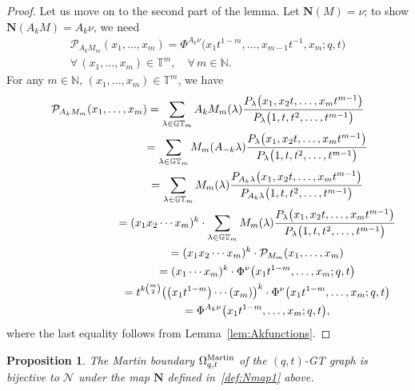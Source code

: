 \documentclass[pdftex]{sigma}
\numberwithin{equation}{section}
\newtheorem{prop}[thm]{Proposition}
\newcommand{\N}{\mathbb{N}}
\newcommand{\Nu}{\mathcal{N}}
\newcommand{\GT}{\mathbb{GT}}
\newcommand{\PPP}{\mathcal{P}}
\newcommand{\TT}{\mathbb{T}}
\newcommand{\NN}{\mathbf{N}}
\begin{document}
\begin{proof}
Let us move on to the second part of the lemma. Let $\NN(M) = \nu$; to show $\NN(A_k M) = A_k \nu$, we need
\begin{gather*}
\PPP_{A_k M_m}(x_1, \dots, x_m) = \Phi^{A_k\nu}\big(x_1 t^{1-m}, \dots, x_{m-1} t^{-1}, x_m; q, t\big)\\
 \forall\, (x_1, \dots, x_m)\in\TT^m, \quad \forall\, m\in\N.
\end{gather*}
For any $m\in\N$, $(x_1, \dots, x_m)\in\TT^m$, we have
\begin{gather*}
\PPP_{A_k M_m}(x_1, \dots, x_m)
= \sum_{\lambda\in\GT_m}{A_k M_m(\lambda)\frac{P_{\lambda}\big(x_1, x_2 t, \dots, x_m t^{m-1}\big)}{P_{\lambda}\big(1, t, t^2, \dots, t^{m-1}\big)}}\\
\hphantom{\PPP_{A_k M_m}(x_1, \dots, x_m)}{} = \sum_{\lambda\in\GT_m}{M_m(A_{-k}\lambda)\frac{P_{\lambda}\big(x_1, x_2 t, \dots, x_m t^{m-1}\big)}{P_{\lambda}\big(1, t, t^2, \dots, t^{m-1}\big)}}\\
\hphantom{\PPP_{A_k M_m}(x_1, \dots, x_m)}{}
= \sum_{\lambda\in\GT_m}{M_m(\lambda)\frac{P_{A_k \lambda}\big(x_1, x_2 t, \dots, x_m t^{m-1}\big)}{P_{A_k \lambda}\big(1, t, t^2, \dots, t^{m-1}\big)}}\\
\hphantom{\PPP_{A_k M_m}(x_1, \dots, x_m)}{} = (x_1x_2\cdots x_m)^k\cdot\sum_{\lambda\in\GT_m}{M_m(\lambda)\frac{P_{\lambda}\big(x_1, x_2 t, \dots, x_m t^{m-1}\big)}{P_{\lambda}\big(1, t, t^2, \dots, t^{m-1}\big)}}\\
\hphantom{\PPP_{A_k M_m}(x_1, \dots, x_m)}{}
= (x_1x_2\cdots x_m)^k\cdot\PPP_{M_m}(x_1, \dots, x_m)\\
\hphantom{\PPP_{A_k M_m}(x_1, \dots, x_m)}{} = (x_1\cdots x_m)^k\cdot\Phi^{\nu}\big(x_1 t^{1-m}, \dots, x_m; q, t\big)\\
\hphantom{\PPP_{A_k M_m}(x_1, \dots, x_m)}{} = t^{k {m \choose 2}}\big(\big(x_1 t^{1-m}\big)\cdots (x_m)\big)^k\cdot\Phi^{\nu}\big(x_1 t^{1-m}, \dots, x_m; q, t\big) \\
\hphantom{\PPP_{A_k M_m}(x_1, \dots, x_m)}{} = \Phi^{A_k \nu}\big( x_1 t^{1-m}, \dots, x_m; q, t\big),
\end{gather*}
where the last equality follows from Lemma~\ref{lem:Akfunctions}.
\end{proof}


\begin{prop}\label{thm:martinboundary0}
The Martin boundary $\Omega_{q, t}^{{\rm Martin}}$ of the $(q, t)$-GT graph is bijective to $\Nu$ under the map $\NN$ defined in~\eqref{def:Nmap1} above.
\end{prop}
\end{document}
